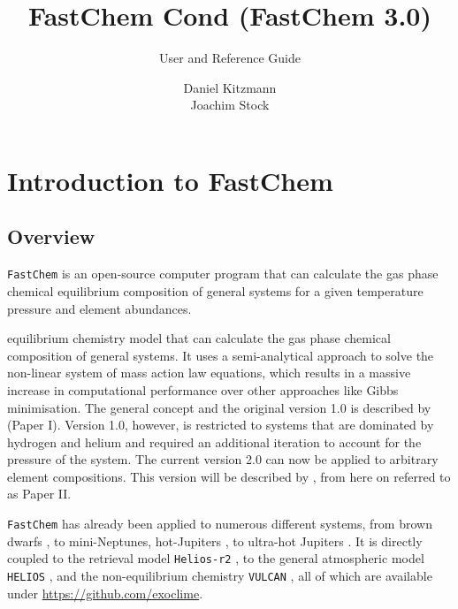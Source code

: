 \documentclass[numbers=noenddot]{aux/fcmanual}
\author{Daniel Kitzmann\\
	    Joachim Stock
}
\title{FastChem Cond (FastChem 3.0)}
\subtitle{User and Reference Guide}
\date{}
\newcommand{\fc}{\texttt{FastChem}\xspace}
\newcommand{\ttt}[1]{\texttt {#1}}
\begin{document}
\maketitle


\tableofcontents

\chapter{Introduction to FastChem}

\section{Overview}

\fc is an open-source computer program that can calculate the gas phase chemical equilibrium composition of general systems for a given temperature pressure and element abundances.


equilibrium chemistry model that can calculate the gas phase chemical composition of general systems. It uses a semi-analytical approach to solve the non-linear system of mass action law equations, which results in a massive increase in computational performance over other approaches like Gibbs minimisation. The general concept and the original version 1.0 is described by \citet{Stock2018MNRAS.479..865S} (Paper I). Version 1.0, however, is restricted to systems that are dominated by hydrogen and helium and required an additional iteration to account for the pressure of the system. The current version 2.0 can now be applied to arbitrary element compositions. This version will be described by \citet{Stock2022MNRAS.517.4070S}, from here on referred to as Paper II.

\fc has already been applied to numerous different systems, from brown dwarfs \citep{Kitzmann2020ApJ...890..174K}, to mini-Neptunes, hot-Jupiters \citep{Bourrier2020A&A...637A..36B}, to ultra-hot Jupiters \citep{Hoeijmakers2019A&A...627A.165H}. It is directly coupled to the retrieval model \ttt{Helios-r2} \citep{Kitzmann2020ApJ...890..174K}, to the general atmospheric model \ttt{HELIOS} \citep{Malik2019AJ....157..170M}, and the non-equilibrium chemistry \ttt{VULCAN} \citep{Tsai2018ApJ...862...31T}, all of which are available under \url{https://github.com/exoclime}.


%
\end{document}
